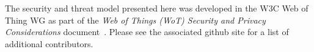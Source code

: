The security and threat model presented here was developed 
in the W3C Web of Thing WG as part of the 
\textit{Web of Things (WoT) Security and Privacy Considerations} 
document~\cite{Wot2017sec}. Please see the associated github site
for a list of additional contributors.
